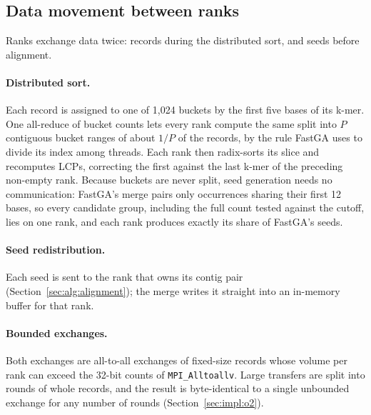 \subsection{Data movement between ranks}\label{sec:alg:mpi}

Ranks exchange data twice: records during the distributed sort, and seeds
before alignment.

\paragraph{Distributed sort.} Each record is assigned to one of 1{,}024
buckets by the first five bases of its k-mer. One all-reduce of bucket
counts lets every rank compute the same split into $P$ contiguous bucket
ranges of about $1/P$ of the records, by the rule FastGA uses to divide its
index among threads. Each rank then radix-sorts its slice and recomputes
LCPs, correcting the first against the last k-mer of the preceding non-empty rank.
Because buckets are never split, seed generation needs no communication:
FastGA's merge pairs only occurrences sharing their first 12 bases, so
every candidate group, including the full count tested against the cutoff,
lies on one rank, and each rank produces exactly its share of FastGA's
seeds.

\paragraph{Seed redistribution.} Each seed is sent to the rank that owns
its contig pair (Section~\ref{sec:alg:alignment}); the merge writes it
straight into an in-memory buffer for that rank.

\paragraph{Bounded exchanges.} Both exchanges are all-to-all
exchanges of fixed-size records whose volume per rank can exceed the 32-bit
counts of \texttt{MPI\_Alltoallv}. Large transfers are split into rounds
of whole records, and the result is byte-identical to a single unbounded
exchange for any number of rounds (Section~\ref{sec:impl:o2}).
